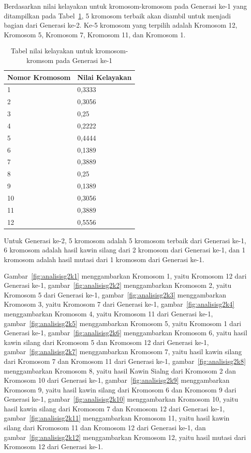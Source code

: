 \clearpage

Berdasarkan nilai kelayakan untuk kromosom-kromosom pada Generasi ke-1 yang ditampilkan pada Tabel~\ref{tab:analisishg2}, 5 kromosom terbaik akan diambil untuk menjadi bagian dari Generasi ke-2. Ke-5 kromosom yang terpilih adalah Kromosom 12, Kromosom 5, Kromosom 7, Kromosom 11, dan Kromosom 1.

\begin{table}
\centering
\captionsetup{justification=centering}
\begin{tabular}{| l | l |}
\hline
Nomor Kromosom & Nilai Kelayakan \\
\hline \hline
1 & 0,3333 \\
\hline
2 & 0,3056 \\
\hline
3 & 0,25 \\
\hline
4 & 0,2222 \\
\hline
5 & 0,4444 \\
\hline
6 & 0,1389 \\
\hline
7 & 0,3889 \\
\hline
8 & 0,25 \\
\hline
9 & 0,1389 \\
\hline
10 & 0,3056 \\
\hline
11 & 0,3889 \\
\hline
12 & 0,5556 \\
\hline
\end{tabular}
\caption[Tabel nilai kelayakan untuk kromosom-kromsom pada Generasi ke-1]{Tabel nilai kelayakan untuk kromosom-kromsom pada Generasi ke-1}
\label{tab:analisishg2}
\end{table}

Untuk Generasi ke-2, 5 kromosom adalah 5 kromosom terbaik dari Generasi ke-1, 6 kromosom adalah hasil kawin silang dari 2 kromosom dari Generasi ke-1, dan 1 kromosom adalah hasil mutasi dari 1 kromosom dari Generasi ke-1.

Gambar~\ref{fig:analisisg2k1} menggambarkan Kromosom 1, yaitu Kromosom 12 dari Generasi ke-1, gambar~\ref{fig:analisisg2k2} menggambarkan Kromosom 2, yaitu Kromosom 5 dari Generasi ke-1, gambar~\ref{fig:analisisg2k3} menggambarkan Kromosom 3, yaitu Kromosom 7 dari Generasi ke-1, gambar~\ref{fig:analisisg2k4} menggambarkan Kromosom 4, yaitu Kromosom 11 dari Generasi ke-1, gambar~\ref{fig:analisisg2k5} menggambarkan Kromosom 5, yaitu Kromosom 1 dari Generasi ke-1, gambar~\ref{fig:analisisg2k6} menggambarkan Kromosom 6, yaitu hasil kawin silang dari Kromosom 5 dan Kromosom 12 dari Generasi ke-1, gambar~\ref{fig:analisisg2k7} menggambarkan Kromosom 7, yaitu hasil kawin silang dari Kromosom 7 dan Kromosom 11 dari Generasi ke-1, gambar~\ref{fig:analisisg2k8} menggambarkan Kromosom 8, yaitu hasil Kawin Sialng dari Kromosom 2 dan Kromosom 10 dari Generasi ke-1, gambar~\ref{fig:analisisg2k9} menggambarkan Kromosom 9, yaitu hasil kawin silang dari Kromosom 6 dan Kromosom 9 dari Generasi ke-1, gambar~\ref{fig:analisisg2k10} menggambarkan Kromosom 10, yaitu hasil kawin silang dari Kromosom 7 dan Kromosom 12 dari Generasi ke-1, gambar~\ref{fig:analisisg2k11} menggambarkan Kromosom 11, yaitu hasil kawin silang dari Kromosom 11 dan Kromosom 12 dari Generasi ke-1, dan gambar~\ref{fig:analisisg2k12} menggambarkan Kromosom 12, yaitu hasil mutasi dari Kromosom 12 dari Generasi ke-1.


